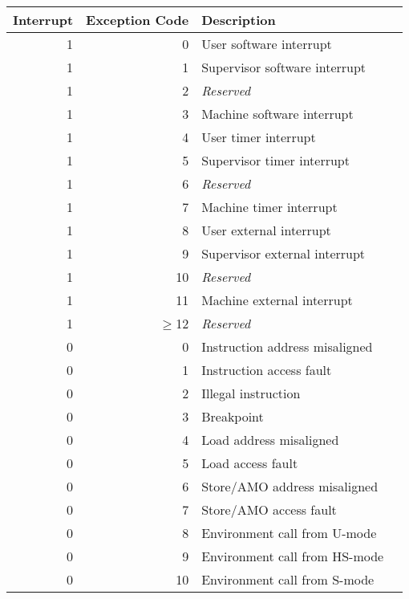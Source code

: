 \begin{table*}[h!]
\begin{center}
\begin{tabular}{|r|r|l|l|}

  \hline
  Interrupt & Exception Code  & Description \\
  \hline	 
  1         & 0               & User software interrupt \\
  1         & 1               & Supervisor software interrupt \\
  1         & 2               & {\em Reserved} \\
  1         & 3               & Machine software interrupt \\
  1         & 4               & User timer interrupt \\
  1         & 5               & Supervisor timer interrupt \\
  1         & 6               & {\em Reserved} \\
  1         & 7               & Machine timer interrupt \\
  1         & 8               & User external interrupt \\
  1         & 9               & Supervisor external interrupt \\
  1         & 10              & {\em Reserved} \\
  1         & 11              & Machine external interrupt \\
  1         & $\ge$12         & {\em Reserved} \\ \hline
  0         & 0               & Instruction address misaligned \\
  0         & 1               & Instruction access fault \\
  0         & 2               & Illegal instruction \\   
  0         & 3               & Breakpoint \\
  0         & 4               & Load address misaligned \\
  0         & 5               & Load access fault \\
  0         & 6               & Store/AMO address misaligned \\
  0         & 7               & Store/AMO access fault \\
  0         & 8               & Environment call from U-mode \\
  0         & 9               & Environment call from HS-mode \\
  0         & 10              & Environment call from S-mode \\

\end{tabular}
\end{center}
\end{table*}
